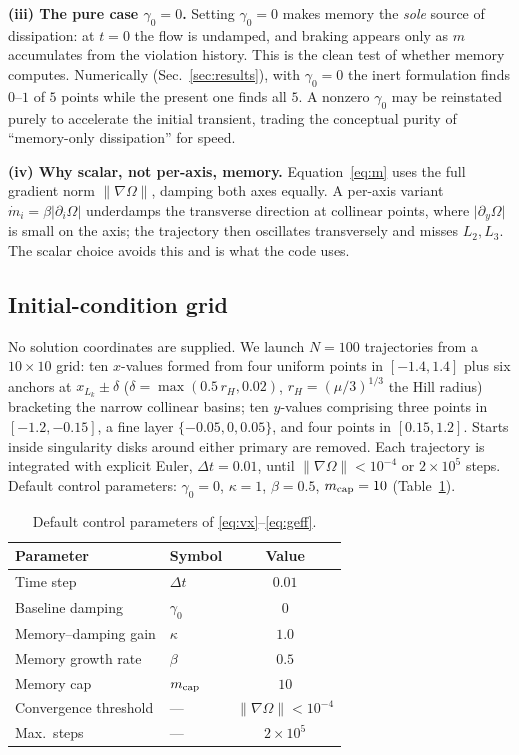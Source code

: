 \documentclass[10pt,twocolumn]{article}
\begin{document}
\textbf{(iii) The pure case $\gamma_0=0$.} Setting $\gamma_0=0$ makes memory the
\emph{sole} source of dissipation: at $t=0$ the flow is undamped, and braking
appears only as $m$ accumulates from the violation history. This is the clean
test of whether memory computes. Numerically (Sec.~\ref{sec:results}), with
$\gamma_0=0$ the inert formulation finds $0$--$1$ of $5$ points while the
present one finds all $5$. A nonzero $\gamma_0$ may be reinstated purely to
accelerate the initial transient, trading the conceptual purity of
``memory-only dissipation'' for speed.

\textbf{(iv) Why scalar, not per-axis, memory.} Equation~\eqref{eq:m} uses the
full gradient norm $\lVert\nabla\Omega\rVert$, damping both axes equally. A
per-axis variant $\dot m_i=\beta\lvert\partial_i\Omega\rvert$ underdamps the
transverse direction at collinear points, where $\lvert\partial_y\Omega\rvert$
is small on the axis; the trajectory then oscillates transversely and misses
$L_2,L_3$. The scalar choice avoids this and is what the code uses.

\subsection{Initial-condition grid}

No solution coordinates are supplied. We launch $N=100$ trajectories from a
$10\times10$ grid: ten $x$-values formed from four uniform points in
$[-1.4,1.4]$ plus six anchors at $x_{L_k}\pm\delta$
($\delta=\max(0.5\,r_H,0.02)$, $r_H=(\mu/3)^{1/3}$ the Hill radius) bracketing
the narrow collinear basins; ten $y$-values comprising three points in
$[-1.2,-0.15]$, a fine layer $\{-0.05,0,0.05\}$, and four points in
$[0.15,1.2]$. Starts inside singularity disks around either primary are removed.
Each trajectory is integrated with explicit Euler, $\Delta t=0.01$, until
$\lVert\nabla\Omega\rVert<10^{-4}$ or $2\times10^5$ steps. Default control
parameters: $\gamma_0=0$, $\kappa=1$, $\beta=0.5$, $m_{\rm cap}=10$
(Table~\ref{tab:params}).

\begin{table}[ht]
\centering
\caption{Default control parameters of \eqref{eq:vx}--\eqref{eq:geff}.}
\label{tab:params}
\small
\begin{tabular}{llc}
\toprule
Parameter & Symbol & Value\\
\midrule
Time step & $\Delta t$ & $0.01$\\
Baseline damping & $\gamma_0$ & $0$ \\
Memory--damping gain & $\kappa$ & $1.0$\\
Memory growth rate & $\beta$ & $0.5$\\
Memory cap & $m_{\rm cap}$ & $10$\\
Convergence threshold & --- & $\lVert\nabla\Omega\rVert<10^{-4}$\\
Max.\ steps & --- & $2\times10^5$\\
\bottomrule
\end{tabular}
\end{table}
\end{document}
